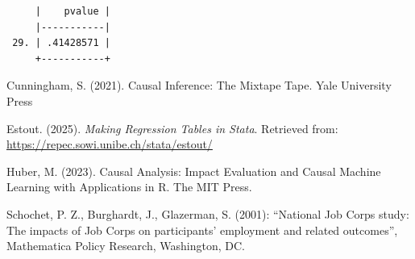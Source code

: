 \documentclass[
]{book}
\begin{document}
\begin{verbatim}
     |    pvalue |
     |-----------|
 29. | .41428571 |
     +-----------+
\end{verbatim}

Cunningham, S. (2021). Causal Inference: The Mixtape Tape. Yale University Press

Estout. (2025). \emph{Making Regression Tables in Stata}. Retrieved from: \url{https://repec.sowi.unibe.ch/stata/estout/}

Huber, M. (2023). Causal Analysis: Impact Evaluation and Causal Machine Learning with Applications in R. The MIT Press.

Schochet, P. Z., Burghardt, J., Glazerman, S. (2001): ``National Job Corps study: The impacts of Job Corps on participants' employment and related outcomes'', Mathematica Policy Research, Washington, DC.


\end{document}
